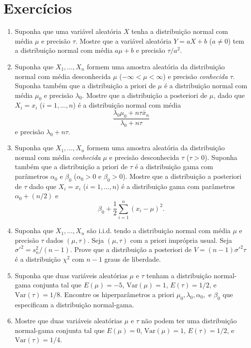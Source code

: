 \section*{Exercícios}

\begin{enumerate}
    \item Suponha que uma variável aleatória $X$ tenha a distribuição normal com média $\mu$ e precisão $\tau$. Mostre que a variável aleatória $Y = aX + b$ ($a \neq 0$) tem a distribuição normal com média $a\mu + b$ e precisão $\tau/a^2$.

    \item Suponha que $X_1, \dots, X_n$ formem uma amostra aleatória da distribuição normal com média desconhecida $\mu$ ($-\infty < \mu < \infty$) e precisão \textit{conhecida} $\tau$. Suponha também que a distribuição a priori de $\mu$ é a distribuição normal com média $\mu_0$ e precisão $\lambda_0$. Mostre que a distribuição a posteriori de $\mu$, dado que $X_i = x_i$ ($i = 1, \dots, n$) é a distribuição normal com média
    $$ \frac{\lambda_0\mu_0 + n\tau\bar{x}_n}{\lambda_0 + n\tau} $$
    e precisão $\lambda_0 + n\tau$.

    \item Suponha que $X_1, \dots, X_n$ formem uma amostra aleatória da distribuição normal com média \textit{conhecida} $\mu$ e precisão desconhecida $\tau$ ($\tau > 0$). Suponha também que a distribuição a priori de $\tau$ é a distribuição gama com parâmetros $\alpha_0$ e $\beta_0$ ($\alpha_0 > 0$ e $\beta_0 > 0$). Mostre que a distribuição a posteriori de $\tau$ dado que $X_i = x_i$ ($i=1, \dots, n$) é a distribuição gama com parâmetros $\alpha_0 + (n/2)$ e
    $$ \beta_0 + \frac{1}{2}\sum_{i=1}^{n}(x_i - \mu)^2. $$
    
    \item Suponha que $X_1, \dots, X_n$ são i.i.d. tendo a distribuição normal com média $\mu$ e precisão $\tau$ dados $(\mu, \tau)$. Seja $(\mu, \tau)$ com a priori imprópria usual. Seja $\sigma'^2 = s_n^2/(n-1)$. Prove que a distribuição a posteriori de $V = (n-1)\sigma'^2\tau$ é a distribuição $\chi^2$ com $n-1$ graus de liberdade.
    
    \item Suponha que duas variáveis aleatórias $\mu$ e $\tau$ tenham a distribuição normal-gama conjunta tal que $E(\mu) = -5$, $\text{Var}(\mu) = 1$, $E(\tau) = 1/2$, e $\text{Var}(\tau) = 1/8$. Encontre os hiperparâmetros a priori $\mu_0, \lambda_0, \alpha_0,$ e $\beta_0$ que especificam a distribuição normal-gama.
    
    \item Mostre que duas variáveis aleatórias $\mu$ e $\tau$ não podem ter uma distribuição normal-gama conjunta tal que $E(\mu) = 0$, $\text{Var}(\mu) = 1$, $E(\tau) = 1/2$, e $\text{Var}(\tau) = 1/4$.

\end{enumerate}
